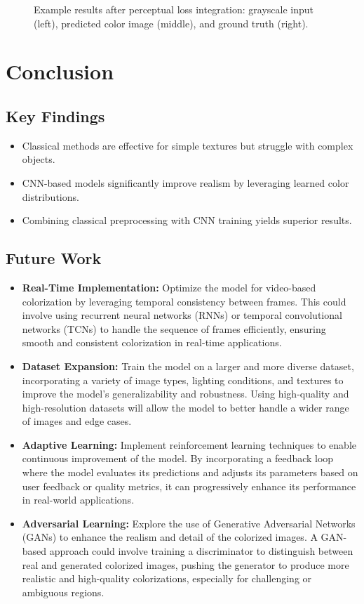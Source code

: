 \documentclass[conference]{IEEEtran}
\begin{document}
\begin{figure}[t]
    \caption{Example results after perceptual loss integration: grayscale input (left), predicted color image (middle), and ground truth (right).}
    \label{fig:after_perceptual_loss}
\end{figure}




\section{Conclusion}
\subsection{Key Findings}
\begin{itemize}
\item Classical methods are effective for simple textures but struggle with complex objects.
\item CNN-based models significantly improve realism by leveraging learned color distributions.
\item Combining classical preprocessing with CNN training yields superior results.
\end{itemize}

\subsection{Future Work}
\begin{itemize}
    \item \textbf{Real-Time Implementation:} Optimize the model for video-based colorization by leveraging temporal consistency between frames. This could involve using recurrent neural networks (RNNs) or temporal convolutional networks (TCNs) to handle the sequence of frames efficiently, ensuring smooth and consistent colorization in real-time applications.
    \item \textbf{Dataset Expansion:} Train the model on a larger and more diverse dataset, incorporating a variety of image types, lighting conditions, and textures to improve the model's generalizability and robustness. Using high-quality and high-resolution datasets will allow the model to better handle a wider range of images and edge cases.
    \item \textbf{Adaptive Learning:} Implement reinforcement learning techniques to enable continuous improvement of the model. By incorporating a feedback loop where the model evaluates its predictions and adjusts its parameters based on user feedback or quality metrics, it can progressively enhance its performance in real-world applications.
    \item \textbf{Adversarial Learning:} Explore the use of Generative Adversarial Networks (GANs) to enhance the realism and detail of the colorized images. A GAN-based approach could involve training a discriminator to distinguish between real and generated colorized images, pushing the generator to produce more realistic and high-quality colorizations, especially for challenging or ambiguous regions.
\end{itemize}
\end{document}
